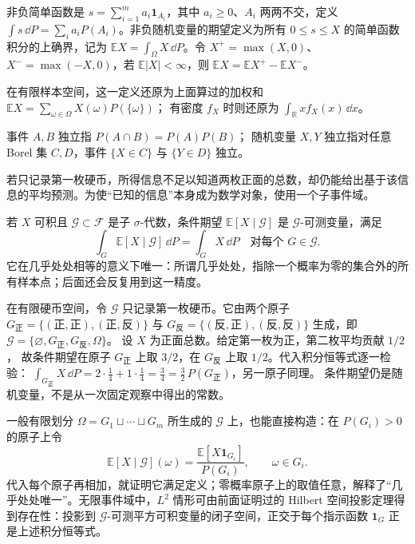 \begin{definition}[期望]
非负简单函数是 \(s=\sum_{i=1}^m a_i\mathbf1_{A_i}\)，其中 \(a_i\ge0\)、\(A_i\) 两两不交，定义 \(\int s\,\dd P=\sum_i a_iP(A_i)\)。非负随机变量的期望定义为所有 \(0\le s\le X\) 的简单函数积分的上确界，记为 \(\mathbb E X=\int_\Omega X\,\dd P\)。令 \(X^+=\max(X,0)\)、\(X^-=\max(-X,0)\)，若 \(\mathbb E|X|<\infty\)，则 \(\mathbb E X=\mathbb E X^+-\mathbb E X^-\)。
\end{definition}

在有限样本空间，这一定义还原为上面算过的加权和
\(\mathbb E X=\sum_{\omega\in\Omega}X(\omega)P(\{\omega\})\)；
有密度 \(f_X\) 时则还原为 \(\int_{\mathbb R}xf_X(x)\,\dd x\)。

\begin{definition}[独立]
事件 \(A,B\) 独立指 \(P(A\cap B)=P(A)P(B)\)；
随机变量 \(X,Y\) 独立指对任意 Borel 集 \(C,D\)，事件
\(\{X\in C\}\) 与 \(\{Y\in D\}\) 独立。
\end{definition}

若只记录第一枚硬币，所得信息不足以知道两枚正面的总数，却仍能给出基于该信息的平均预测。为使“已知的信息”本身成为数学对象，使用一个子事件域。

\begin{definition}[条件期望]
若 \(X\) 可积且 \(\mathcal G\subset\mathcal F\) 是子 \(\sigma\)-代数，条件期望 \(\mathbb E[X\mid\mathcal G]\) 是 \(\mathcal G\)-可测变量，满足
\[
\int_G\mathbb E[X\mid\mathcal G]\,\dd P=\int_GX\,\dd P
\quad\text{对每个 }G\in\mathcal G.
\]
它在几乎处处相等的意义下唯一：所谓几乎处处，指除一个概率为零的集合外的所有样本点；后面还会反复用到这一精度。
\end{definition}

在有限硬币空间，令 \(\mathcal G\) 只记录第一枚硬币。它由两个原子
\(G_{\text{正}}=\{(\text{正},\text{正}),(\text{正},\text{反})\}\)
与
\(G_{\text{反}}=\{(\text{反},\text{正}),(\text{反},\text{反})\}\)
生成，即
\(\mathcal G=\{\varnothing,G_{\text{正}},G_{\text{反}},\Omega\}\)。
设 \(X\) 为正面总数。给定第一枚为正，第二枚平均贡献 \(1/2\)，
故条件期望在原子 \(G_{\text{正}}\) 上取 \(3/2\)，在
\(G_{\text{反}}\) 上取 \(1/2\)。代入积分恒等式逐一检验：
\(\int_{G_{\text{正}}}X\,\dd P
=2\cdot\tfrac14+1\cdot\tfrac14=\tfrac34
=\tfrac32\,P(G_{\text{正}})\)，另一原子同理。
条件期望仍是随机变量，不是从一次固定观察中得出的常数。

一般有限划分 \(\Omega=G_1\sqcup\cdots\sqcup G_m\) 所生成的 \(\mathcal G\) 上，也能直接构造：在 \(P(G_i)>0\) 的原子上令
\[
\mathbb E[X\mid\mathcal G](\omega)
=\frac{\mathbb E[X\mathbf1_{G_i}]}{P(G_i)},\qquad \omega\in G_i.
\]
代入每个原子再相加，就证明它满足定义；零概率原子上的取值任意，解释了“几乎处处唯一”。无限事件域中，\(L^2\) 情形可由前面证明过的 Hilbert 空间投影定理得到存在性：投影到 \(\mathcal G\)-可测平方可积变量的闭子空间，正交于每个指示函数 \(\mathbf1_G\) 正是上述积分恒等式。

